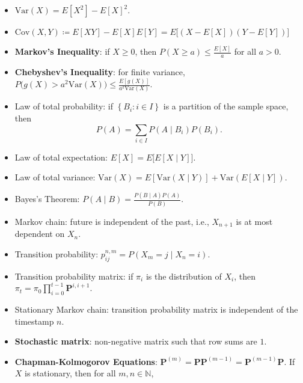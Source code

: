 \documentclass[10pt]{article}
\begin{document}
    \begin{multicols*}{2}
        \begin{itemize}
            \item $\mathrm{Var}\left(X\right) = E\left[X^2\right] - E\left[X\right]^2$.
            \item $\mathrm{Cov}\left(X, Y\right) \coloneqq E\left[XY\right] - E\left[X\right]E\left[Y\right] = E\bigl[\left(X - E\left[X\right]\right)\left(Y - E\left[Y\right]\right)\bigr]$
            \item \textbf{Markov's Inequality}: if $X \geq 0$, then $P\left(X \geq a\right) \leq \frac{E\left[X\right]}{a}$ for all $a > 0$.
            \item \textbf{Chebyshev's Inequality}: for finite variance, $P\bigl(g\left(X\right) > a^2\mathrm{Var}\left(X\right)\bigr) \leq \frac{E[g\left(X\right)]}{a^2\mathrm{Var}\left(X\right)}$.
            \item Law of total probability: if $\left\{B_i \colon i \in I\right\}$ is a partition of the sample space, then
            \begin{equation*}
                P\left(A\right) = \sum_{i \in I}P\left(A \mid B_i\right)P\left(B_i\right).
            \end{equation*}
            \item Law of total expectation: $E\left[X\right] = E\bigl[E\left[X \mid Y\right]\bigr]$.
            \item Law of total variance: $\mathrm{Var}\left(X\right) = E\left[\mathrm{Var}\left(X \mid Y\right)\right] + \mathrm{Var}\left(E\left[X \mid Y\right]\right)$.
            \item Bayes's Theorem: $P\left(A \mid B\right) = \frac{P\left(B \mid A\right)P\left(A\right)}{P\left(B\right)}$.
            \item Markov chain: future is independent of the past, i.e., $X_{n + 1}$ is at most dependent on $X_n$.
            \item Transition probability: $p_{ij}^{n, m} = P\left(X_m = j \mid X_n = i\right)$.
            \item Transition probability matrix: if $\pi_i$ is the distribution of $X_i$, then $\pi_t = \pi_0\prod_{i = 0}^{t - 1}\bm{P}^{i, i + 1}$.
            \item Stationary Markov chain: transition probability matrix is independent of the timestamp $n$.
            \item \textbf{Stochastic matrix}: non-negative matrix such that row sums are $1$.
            \item \textbf{Chapman-Kolmogorov Equations}: $\bm{P}^{\left(m\right)} = \bm{P}\bm{P}^{\left(m - 1\right)} = \bm{P}^{\left(m - 1\right)}\bm{P}$. If $X$ is stationary, then for all $m, n \in \mathbb{N}$,

\end{itemize}
\end{multicols*}
\end{document}
